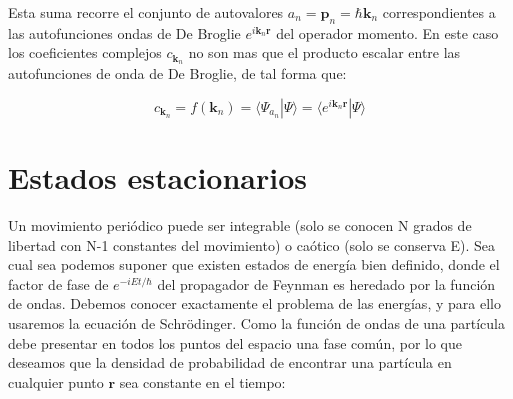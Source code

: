 \documentclass[12pt]{article}
\newcommand{\rn}{\mathbf{r}}
\newcommand{\pn}{\mathbf{p}}
\newcommand{\kn}{\mathbf{k}}
\begin{document}
Esta suma recorre el conjunto de autovalores $a_n = \pn_n = \hbar \kn_n$ correspondientes a las autofunciones ondas de De Broglie $e^{i \kn_n \rn}$ del operador momento. En este caso los coeficientes complejos $c_{\kn_n}$ no son mas que el producto escalar entre las autofunciones de onda de De Broglie, de tal forma que:

\begin{equation}
c_{\kn_n} = f(\kn_n) = \langle \Psi_{a_n} | \Psi \rangle = \langle e^{i \kn_n \rn} | \Psi \rangle
\end{equation}

\section{Estados estacionarios}








Un movimiento periódico puede ser integrable (solo se conocen N grados de libertad con N-1 constantes del movimiento) o caótico (solo se conserva E). Sea cual sea podemos suponer que existen estados de energía bien definido, donde el factor de fase de $e^{-iEt/\hbar}$ del propagador de Feynman es heredado por la función de ondas. Debemos conocer exactamente el problema de las energías, y para ello usaremos la ecuación de Schrödinger. Como la función de ondas de una partícula debe presentar en todos los puntos del espacio una fase común, por lo que deseamos que la densidad de probabilidad de encontrar una partícula en cualquier punto $\rn$ sea constante en el tiempo:
\end{document}

